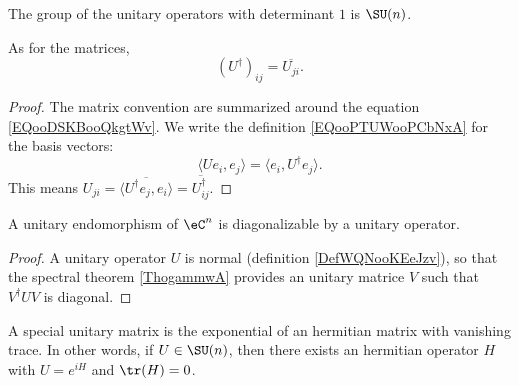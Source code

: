 \begin{definition}
    The group of the unitary operators with determinant \( 1\) is \( \SU(n)\).
\end{definition}

\begin{lemma}
    As for the matrices,
    \begin{equation}
        (U^{\dag})_{ij}=\overline{ U_{ji} }.
    \end{equation}
\end{lemma}

\begin{proof}
    The matrix convention are summarized around the equation \eqref{EQooDSKBooQkgtWv}. We write the definition \eqref{EQooPTUWooPCbNxA} for the basis vectors:
    \begin{equation}
        \langle Ue_i, e_j\rangle =\langle e_i, U^{\dag}e_j\rangle .
    \end{equation}
    This means \( U_{ji}=\overline{ \langle U^{\dag}e_j, e_i\rangle  }=\overline{ U^{\dag}_{ij} }\).
\end{proof}

\begin{proposition}     \label{PROPooYXPRooBgikdE}
    A unitary endomorphism of \( \eC^n\) is diagonalizable by a unitary operator.
\end{proposition}

\begin{proof}
    A unitary operator \( U\) is normal (definition \ref{DefWQNooKEeJzv}), so that the spectral theorem \ref{ThogammwA} provides an unitary matrice \( V\) such that \( V^{\dag}UV\) is diagonal.
\end{proof}

\begin{proposition}     \label{PROPooZBJSooEIguXR}
    A special unitary matrix is the exponential of an hermitian matrix with vanishing trace. In other words, if \( U\in \SU(n)\), then there exists an hermitian operator \( H\) with \( U= e^{iH}\) and \( \tr(H)=0\).
\end{proposition}

